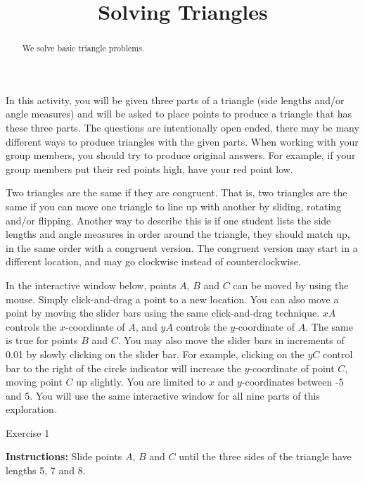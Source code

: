 \documentclass{ximera}
\title{Solving Triangles}
\begin{document}
\begin{abstract}
  We solve basic triangle problems.
\end{abstract}
\maketitle

In this activity, you will be given three parts of a triangle (side lengths and/or angle measures) and will be asked to place points to produce a triangle that has these three parts. The questions are intentionally open ended, there may be many different ways to produce triangles with the given parts. When working with your group members, you should try to produce original answers. For example, if your group members put their red points high, have your red point low.

\bigskip

Two triangles are the same if they are congruent. That is, two triangles are the same if you can move one triangle to line up with another by sliding, rotating and/or flipping. Another way to describe this is if one student lists the side lengths and angle measures in order around the triangle, they should match up, in the same order with a congruent version. The congruent version may start in a different location, and may go clockwise instead of counterclockwise.

In the interactive window below, points $A$, $B$ and $C$ can be moved by using the mouse. Simply click-and-drag a point to a new location. You can also move a point by moving the slider bars using the same click-and-drag technique. $xA$ controls the $x$-coordinate of $A$, and $yA$ controls the $y$-coordinate of $A$. The same is true for points $B$ and $C$. You may also move the slider bars in increments of 0.01 by slowly clicking on the slider bar. For example, clicking on the $yC$ control bar to the right of the circle indicator will increase the $y$-coordinate of point $C$, moving point $C$ up slightly. You are limited to $x$ and $y$-coordinates between -5 and 5. You will use the same interactive window for all nine parts of this exploration.


Exercise 1

{\bf {Instructions:}} Slide points $A$, $B$ and $C$ until the three sides of the triangle have lengths 5, 7 and 8. 
\end{document}
